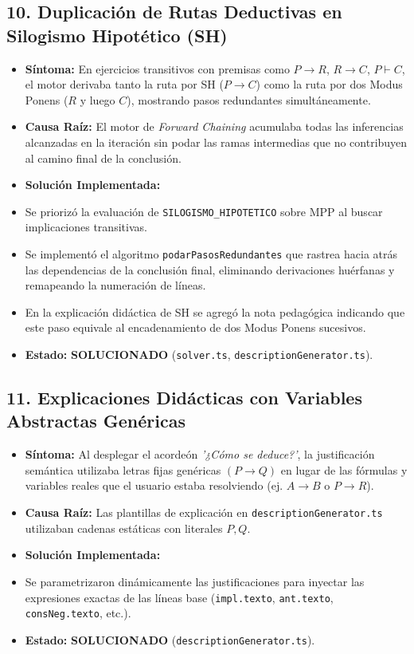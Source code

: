 \documentclass[11pt,a4paper,openany]{book}
\begin{document}
\hrulefill

\subsection{10.  Duplicación de Rutas Deductivas en Silogismo Hipotético (SH)}

\begin{itemize}[leftmargin=*]
\item \textbf{Síntoma:} En ejercicios transitivos con premisas como $P \to R$, $R \to C$, $P \vdash C$, el motor derivaba tanto la ruta por SH ($P \to C$) como la ruta por dos Modus Ponens ($R$ y luego $C$), mostrando pasos redundantes simultáneamente.
\item \textbf{Causa Raíz:} El motor de \textit{Forward Chaining} acumulaba todas las inferencias alcanzadas en la iteración sin podar las ramas intermedias que no contribuyen al camino final de la conclusión.
\item \textbf{Solución Implementada:}
\item Se priorizó la evaluación de \texttt{SILOGISMO\_HIPOTETICO} sobre MPP al buscar implicaciones transitivas.
\item Se implementó el algoritmo \texttt{podarPasosRedundantes} que rastrea hacia atrás las dependencias de la conclusión final, eliminando derivaciones huérfanas y remapeando la numeración de líneas.
\item En la explicación didáctica de SH se agregó la nota pedagógica indicando que este paso equivale al encadenamiento de dos Modus Ponens sucesivos.
\item \textbf{Estado:}  \textbf{SOLUCIONADO} (\texttt{solver.ts}, \texttt{descriptionGenerator.ts}).
\end{itemize}

\hrulefill

\subsection{11.  Explicaciones Didácticas con Variables Abstractas Genéricas}

\begin{itemize}[leftmargin=*]
\item \textbf{Síntoma:} Al desplegar el acordeón \textit{'¿Cómo se deduce?'}, la justificación semántica utilizaba letras fijas genéricas $(P \to Q)$ en lugar de las fórmulas y variables reales que el usuario estaba resolviendo (ej. $A \to B$ o $P \to R$).
\item \textbf{Causa Raíz:} Las plantillas de explicación en \texttt{descriptionGenerator.ts} utilizaban cadenas estáticas con literales $P, Q$.
\item \textbf{Solución Implementada:}
\item Se parametrizaron dinámicamente las justificaciones para inyectar las expresiones exactas de las líneas base (\texttt{impl.texto}, \texttt{ant.texto}, \texttt{consNeg.texto}, etc.).
\item \textbf{Estado:}  \textbf{SOLUCIONADO} (\texttt{descriptionGenerator.ts}).
\end{itemize}
\end{document}
